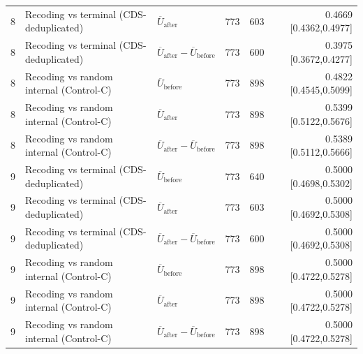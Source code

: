 \begin{longtable}{r l l r r r}
8 & Recoding vs terminal (CDS-deduplicated) & $\overline{U}_{\mathrm{after}}$ & 773 & 603 & 0.4669 [0.4362,0.4977] \\
8 & Recoding vs terminal (CDS-deduplicated) & $\overline{U}_{\mathrm{after}}-\overline{U}_{\mathrm{before}}$ & 773 & 600 & 0.3975 [0.3672,0.4277] \\
8 & Recoding vs random internal (Control-C) & $\overline{U}_{\mathrm{before}}$ & 773 & 898 & 0.4822 [0.4545,0.5099] \\
8 & Recoding vs random internal (Control-C) & $\overline{U}_{\mathrm{after}}$ & 773 & 898 & 0.5399 [0.5122,0.5676] \\
8 & Recoding vs random internal (Control-C) & $\overline{U}_{\mathrm{after}}-\overline{U}_{\mathrm{before}}$ & 773 & 898 & 0.5389 [0.5112,0.5666] \\
9 & Recoding vs terminal (CDS-deduplicated) & $\overline{U}_{\mathrm{before}}$ & 773 & 640 & 0.5000 [0.4698,0.5302] \\
9 & Recoding vs terminal (CDS-deduplicated) & $\overline{U}_{\mathrm{after}}$ & 773 & 603 & 0.5000 [0.4692,0.5308] \\
9 & Recoding vs terminal (CDS-deduplicated) & $\overline{U}_{\mathrm{after}}-\overline{U}_{\mathrm{before}}$ & 773 & 600 & 0.5000 [0.4692,0.5308] \\
9 & Recoding vs random internal (Control-C) & $\overline{U}_{\mathrm{before}}$ & 773 & 898 & 0.5000 [0.4722,0.5278] \\
9 & Recoding vs random internal (Control-C) & $\overline{U}_{\mathrm{after}}$ & 773 & 898 & 0.5000 [0.4722,0.5278] \\
9 & Recoding vs random internal (Control-C) & $\overline{U}_{\mathrm{after}}-\overline{U}_{\mathrm{before}}$ & 773 & 898 & 0.5000 [0.4722,0.5278] \\
\bottomrule
\end{longtable}
\endgroup

